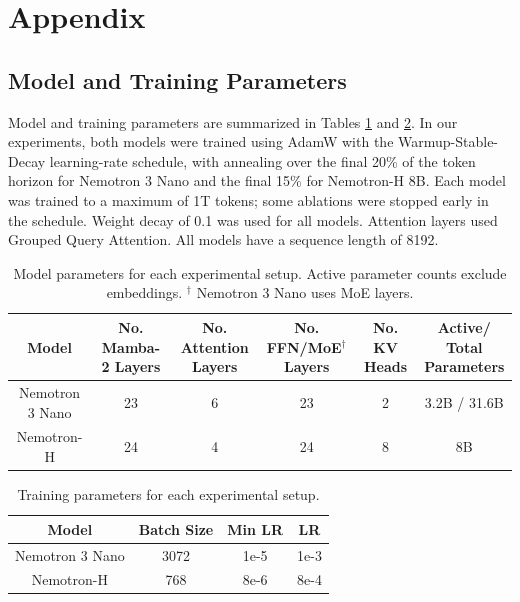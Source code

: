 \section{Appendix}

\subsection{Model and Training Parameters}
\label{model_and_training_params}
Model and training parameters are summarized in Tables \ref{model_params} and \ref{train_params}. In our experiments, both models were trained using AdamW with the Warmup-Stable-Decay learning-rate schedule, with annealing over the final 20\% of the token horizon for Nemotron 3 Nano and the final 15\% for Nemotron-H 8B. Each model was trained to a maximum of 1T tokens; some ablations were stopped early in the schedule. Weight decay of 0.1 was used for all models. Attention layers used Grouped Query Attention. All models have a sequence length of 8192.

\begin{table}[h]
  \centering
  \caption{Model parameters for each experimental setup. Active parameter counts exclude embeddings. $^\dagger$ Nemotron 3 Nano uses MoE layers.}
  \begin{tabular}{|c|c|c|c|c|c|}
    \hline
    Model & No. Mamba-2 Layers & No. Attention Layers & \shortstack{No. FFN/MoE$^\dagger$\\Layers} & No. KV Heads & \shortstack{Active/ Total\\Parameters}\\
    \hline
    Nemotron 3 Nano & 23 & 6 & 23 & 2 & 3.2B / 31.6B\\
    \hline
    Nemotron-H & 24 & 4 & 24 & 8 & 8B \\
    \hline
  \end{tabular}
  \label{model_params}
\end{table}


\begin{table}[h]
  \centering
  \caption{Training parameters for each experimental setup.}
  \begin{tabular}{|c|c|c|c|}
    \hline
    Model & Batch Size & Min LR & LR\\
    \hline
    Nemotron 3 Nano & 3072 & 1e-5 & 1e-3\\
    \hline
    Nemotron-H & 768 & 8e-6 & 8e-4 \\
    \hline
  \end{tabular}
  \label{train_params}
\end{table}


